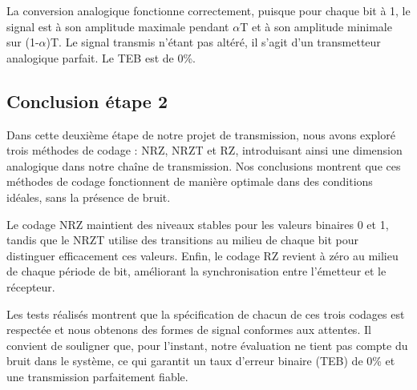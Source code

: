 La conversion analogique fonctionne correctement, puisque pour chaque bit à 1, le signal est à son amplitude maximale pendant $\alpha$T et à son amplitude minimale sur (1-$\alpha$)T. Le signal transmis n'étant pas altéré, il s'agit d'un transmetteur analogique parfait. Le TEB est de 0\%.

\subsection{Conclusion étape 2}

Dans cette deuxième étape de notre projet de transmission, nous avons exploré trois méthodes de codage : NRZ, NRZT et RZ, introduisant ainsi une dimension analogique dans notre chaîne de transmission. Nos conclusions montrent que ces méthodes de codage fonctionnent de manière optimale dans des conditions idéales, sans la présence de bruit. 

Le codage NRZ maintient des niveaux stables pour les valeurs binaires 0 et 1, tandis que le NRZT utilise des transitions au milieu de chaque bit pour distinguer efficacement ces valeurs. Enfin, le codage RZ revient à zéro au milieu de chaque période de bit, améliorant la synchronisation entre l'émetteur et le récepteur.

Les tests réalisés montrent que la spécification de chacun de ces trois codages est respectée et nous obtenons des formes de signal conformes aux attentes. Il convient de souligner que, pour l'instant, notre évaluation ne tient pas compte du bruit dans le système, ce qui garantit un taux d'erreur binaire (TEB) de 0\% et une transmission parfaitement fiable. 